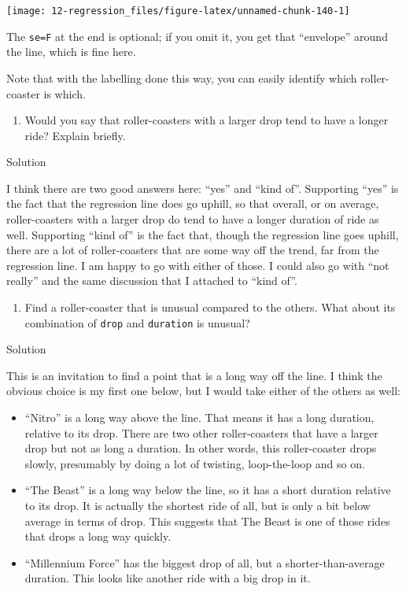 \documentclass[]{tufte-book}
\providecommand{\tightlist}{%
  \setlength{\itemsep}{0pt}\setlength{\parskip}{0pt}}
\theoremstyle{definition}
\theoremstyle{definition}
\theoremstyle{definition}
\theoremstyle{remark}
\begin{document}
\texttt{[image: 12-regression\_files/figure-latex/unnamed-chunk-140-1]}

The \texttt{se=F} at the end is optional; if you omit it, you get that
``envelope'' around the line, which is fine here.

Note that with the labelling done this way, you can easily identify
which roller-coaster is which.

\begin{enumerate}
\def\labelenumi{(\alph{enumi})}
\setcounter{enumi}{2}
\tightlist
\item
  Would you say that roller-coasters with a larger drop tend to have a
  longer ride? Explain briefly.
\end{enumerate}

Solution

I think there are two good answers here: ``yes'' and ``kind of''.
Supporting ``yes'' is the fact that the regression line does go uphill,
so that overall, or on average, roller-coasters with a larger drop do
tend to have a longer duration of ride as well. Supporting ``kind of''
is the fact that, though the regression line goes uphill, there are a
lot of roller-coasters that are some way off the trend, far from the
regression line. I am happy to go with either of those. I could also go
with ``not really'' and the same discussion that I attached to ``kind
of''.

\begin{enumerate}
\def\labelenumi{(\alph{enumi})}
\setcounter{enumi}{3}
\tightlist
\item
  Find a roller-coaster that is unusual compared to the others. What
  about its combination of \texttt{drop} and \texttt{duration} is
  unusual?
\end{enumerate}

Solution

This is an invitation to find a point that is a long way off the line. I
think the obvious choice is my first one below, but I would take either
of the others as well:

\begin{itemize}
\item
  ``Nitro'' is a long way above the line. That means it has a long
  duration, relative to its drop. There are two other roller-coasters
  that have a larger drop but not as long a duration. In other words,
  this roller-coaster drops slowly, presumably by doing a lot of
  twisting, loop-the-loop and so on.
\item
  ``The Beast'' is a long way below the line, so it has a short duration
  relative to its drop. It is actually the shortest ride of all, but is
  only a bit below average in terms of drop. This suggests that The
  Beast is one of those rides that drops a long way quickly.
\item
  ``Millennium Force'' has the biggest drop of all, but a
  shorter-than-average duration. This looks like another ride with a big
  drop in it.
\end{itemize}
\end{document}
